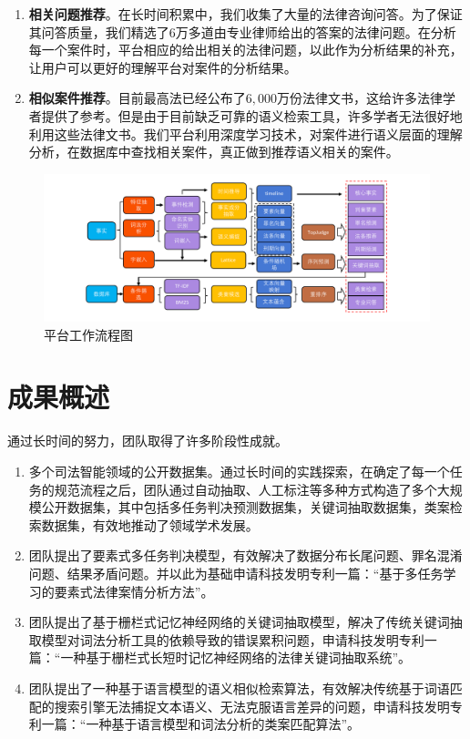 \begin{enumerate}[1)]
	\item \textbf{相关问题推荐}。在长时间积累中，我们收集了大量的法律咨询问答。为了保证其问答质量，我们精选了$6$万多道由专业律师给出的答案的法律问题。在分析每一个案件时，平台相应的给出相关的法律问题，以此作为分析结果的补充，让用户可以更好的理解平台对案件的分析结果。
	\item \textbf{相似案件推荐}。目前最高法已经公布了$6,000$万份法律文书，这给许多法律学者提供了参考。但是由于目前缺乏可靠的语义检索工具，许多学者无法很好地利用这些法律文书。我们平台利用深度学习技术，对案件进行语义层面的理解分析，在数据库中查找相关案件，真正做到推荐语义相关的案件。
	\end{enumerate}

\begin{figure}
	\centering
    \includegraphics[width=\linewidth]{figures/flowsheet}
    \caption{平台工作流程图}
    \label{fig:flowsheet}
\end{figure}


\section{成果概述}

通过长时间的努力，团队取得了许多阶段性成就。

\begin{enumerate}[1)]
	\item 多个司法智能领域的公开数据集。通过长时间的实践探索，在确定了每一个任务的规范流程之后，团队通过自动抽取、人工标注等多种方式构造了多个大规模公开数据集，其中包括多任务判决预测数据集，关键词抽取数据集，类案检索数据集，有效地推动了领域学术发展。
	\item 团队提出了要素式多任务判决模型，有效解决了数据分布长尾问题、罪名混淆问题、结果矛盾问题。并以此为基础申请科技发明专利一篇：“基于多任务学习的要素式法律案情分析方法”。
	\item 团队提出了基于栅栏式记忆神经网络的关键词抽取模型，解决了传统关键词抽取模型对词法分析工具的依赖导致的错误累积问题，申请科技发明专利一篇：“一种基于栅栏式长短时记忆神经网络的法律关键词抽取系统”。
	\item 团队提出了一种基于语言模型的语义相似检索算法，有效解决传统基于词语匹配的搜索引擎无法捕捉文本语义、无法克服语言差异的问题，申请科技发明专利一篇：“一种基于语言模型和词法分析的类案匹配算法”。
\end{enumerate}

